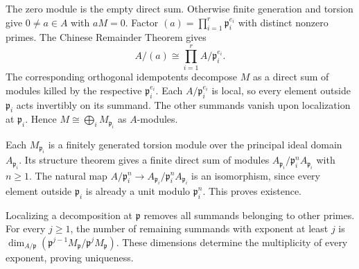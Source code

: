 The zero module is the empty direct sum. Otherwise finite generation and torsion give $0\ne a\in A$ with $aM=0$. Factor $(a)=\prod_{i=1}^r\mathfrak p_i^{e_i}$ with distinct nonzero primes. The Chinese Remainder Theorem gives
\[A/(a)\cong\prod_{i=1}^r A/\mathfrak p_i^{e_i}.\]
The corresponding orthogonal idempotents decompose $M$ as a direct sum of modules killed by the respective $\mathfrak p_i^{e_i}$. Each $A/\mathfrak p_i^{e_i}$ is local, so every element outside $\mathfrak p_i$ acts invertibly on its summand. The other summands vanish upon localization at $\mathfrak p_i$. Hence $M\cong\bigoplus_iM_{\mathfrak p_i}$ as $A$-modules.

Each $M_{\mathfrak p_i}$ is a finitely generated torsion module over the principal ideal domain $A_{\mathfrak p_i}$. Its structure theorem gives a finite direct sum of modules $A_{\mathfrak p_i}/\mathfrak p_i^nA_{\mathfrak p_i}$ with $n\geq1$. The natural map $A/\mathfrak p_i^n\to A_{\mathfrak p_i}/\mathfrak p_i^nA_{\mathfrak p_i}$ is an isomorphism, since every element outside $\mathfrak p_i$ is already a unit modulo $\mathfrak p_i^n$. This proves existence.

Localizing a decomposition at $\mathfrak p$ removes all summands belonging to other primes. For every $j\geq1$, the number of remaining summands with exponent at least $j$ is $\dim_{A/\mathfrak p}(\mathfrak p^{j-1}M_{\mathfrak p}/\mathfrak p^jM_{\mathfrak p})$. These dimensions determine the multiplicity of every exponent, proving uniqueness.
